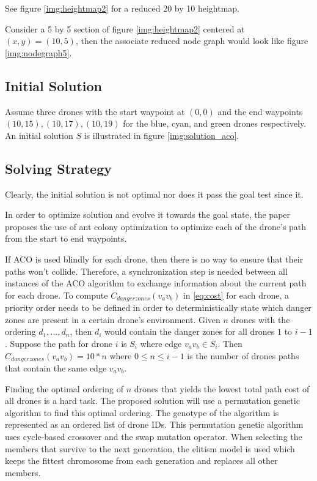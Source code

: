 \documentclass[conference]{IEEEtran}
\begin{document}
See figure \ref{img:heightmap2} for a reduced 20 by 10 heightmap.

Consider a 5 by 5 section of figure \ref{img:heightmap2} centered at $(x, y) = (10, 5)$, then the associate reduced node graph would look like figure \ref{img:nodegraph5}.

\subsection{Initial Solution}
Assume three drones with the start waypoint at $(0, 0)$ and the end waypoints $(10, 15), (10, 17), (10, 19)$ for the blue, cyan, and green drones respectively. An initial solution $S$ is illustrated in figure \ref{img:solution_aco}.

\subsection{Solving Strategy}
Clearly, the initial solution is not optimal nor does it pass the goal test since it.

In order to optimize solution and evolve it towards the goal state, the paper proposes the use of ant colony optimization to optimize each of the drone's path from the start to end waypoints.

If ACO is used blindly for each drone, then there is no way to ensure that their paths won't collide. Therefore, a synchronization step is needed between all instances of the ACO algorithm to exchange information about the current path for each drone. To compute $C_{danger zones}(v_av_b)$ in \ref{eq:cost} for each drone, a priority order needs to be defined in order to deterministically state which danger zones are present in a certain drone's environment. Given $n$ drones with the ordering $d_1, ..., d_n$, then $d_i$ would contain the danger zones for all drones $1$ to $i-1$. Suppose the path for drone $i$ is $S_i$ where edge $v_av_b \in S_i$. Then $C_{danger zones}(v_av_b) = 10*n$ where $0 \leq n \leq i-1$ is the number of drones paths that contain the same edge $v_av_b$.

Finding the optimal ordering of $n$ drones that yields the lowest total path cost of all drones is a hard task. The proposed solution will use a permutation genetic algorithm to find this optimal ordering. The genotype of the algorithm is represented as an ordered list of drone IDs. This permutation genetic algorithm uses cycle-based crossover and the swap mutation operator. When selecting the members that survive to the next generation, the elitism model is used which keeps the fittest chromosome from each generation and replaces all other members.
\end{document}
